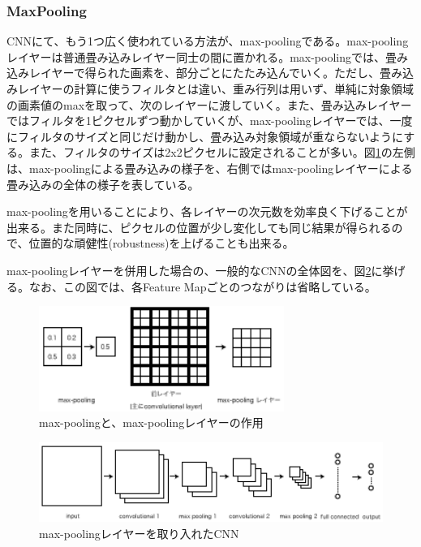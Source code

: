 \subsubsection{MaxPooling}
CNNにて、もう1つ広く使われている方法が、max-poolingである。max-poolingレイヤーは普通畳み込みレイヤー同士の間に置かれる。max-poolingでは、畳み込みレイヤーで得られた画素を、部分ごとにたたみ込んでいく。ただし、畳み込みレイヤーの計算に使うフィルタとは違い、重み行列は用いず、単純に対象領域の画素値のmaxを取って、次のレイヤーに渡していく。また、畳み込みレイヤーではフィルタを1ピクセルずつ動かしていくが、max-poolingレイヤーでは、一度にフィルタのサイズと同じだけ動かし、畳み込み対象領域が重ならないようにする。また、フィルタのサイズは2x2ピクセルに設定されることが多い。図\ref{c3_maxpooling}の左側は、max-poolingによる畳み込みの様子を、右側ではmax-poolingレイヤーによる畳み込みの全体の様子を表している。\par
max-poolingを用いることにより、各レイヤーの次元数を効率良く下げることが出来る。また同時に、ピクセルの位置が少し変化しても同じ結果が得られるので、位置的な頑健性(robustness)を上げることも出来る。\par
max-poolingレイヤーを併用した場合の、一般的なCNNの全体図を、図\ref{c3_convnet}に挙げる。なお、この図では、各Feature Mapごとのつながりは省略している。

\begin{figure}[tbp]
 \centering
  \includegraphics[width=80mm]{img/c3/maxpooling}
 \caption{max-poolingと、max-poolingレイヤーの作用}
 \label{c3_maxpooling}
\end{figure}

\begin{figure}[tbp]
 \centering
  \includegraphics[width=120mm]{img/c3/convnet}
 \caption{max-poolingレイヤーを取り入れたCNN}
 \label{c3_convnet}
\end{figure}

